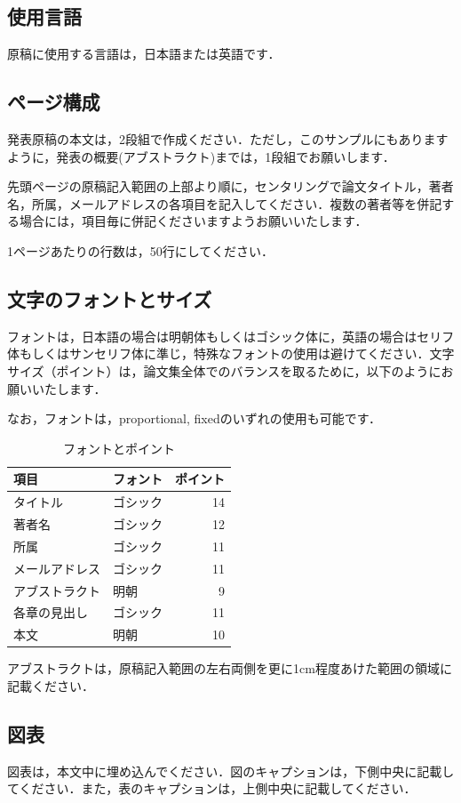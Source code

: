 \documentclass[dvipdfmx]{jaeis-national-convention}
\begin{document}
\subsection{使用言語}
原稿に使用する言語は，日本語または英語です．

\subsection{ページ構成}
発表原稿の本文は，2段組で作成ください．ただし，このサンプルにもありますように，発表の概要(アブストラクト)までは，1段組でお願いします．

先頭ページの原稿記入範囲の上部より順に，センタリングで論文タイトル，著者名，所属，メールアドレスの各項目を記入してください．複数の著者等を併記する場合には，項目毎に併記くださいますようお願いいたします．

1ページあたりの行数は，50行にしてください．

\subsection{文字のフォントとサイズ}
フォントは，日本語の場合は明朝体もしくはゴシック体に，英語の場合はセリフ体もしくはサンセリフ体に準じ，特殊なフォントの使用は避けてください．文字サイズ（ポイント）は，論文集全体でのバランスを取るために，以下のようにお願いいたします．

なお，フォントは，proportional, fixedのいずれの使用も可能です．

\begin{table}[htb]
	\caption{フォントとポイント}
	\begin{tabularx}{\columnwidth}{llr}
		\hline
		\textbf{項目} & \textbf{フォント} & \textbf{ポイント} \\ \hline
		タイトル & ゴシック & 14 \\
		著者名 & ゴシック & 12 \\
		所属 & ゴシック & 11 \\
		メールアドレス & ゴシック& 11 \\
		アブストラクト & 明朝 & 9 \\
		各章の見出し & ゴシック & 11 \\
		本文 & 明朝 & 10 \\
		\hline
	\end{tabularx}
\end{table}

アブストラクトは，原稿記入範囲の左右両側を更に1cm程度あけた範囲の領域に記載ください．

\subsection{図表}
図表は，本文中に埋め込んでください．図のキャプションは，下側中央に記載してください．また，表のキャプションは，上側中央に記載してください．
\end{document}
